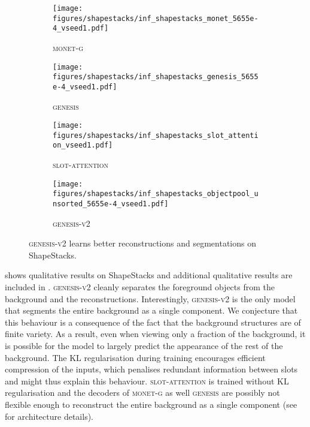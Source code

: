 \documentclass{article}
\begin{document}
\begin{figure}
	\centering
	\begin{subfigure}{0.259\linewidth}
		\texttt{[image: figures/shapestacks/inf\_shapestacks\_monet\_5655e-4\_vseed1.pdf]}
		\caption{\textsc{monet-g}}
	\end{subfigure}
	\begin{subfigure}{0.24\linewidth}
		\texttt{[image: figures/shapestacks/inf\_shapestacks\_genesis\_5655e-4\_vseed1.pdf]}
		\caption{\textsc{genesis}}
	\end{subfigure}
	\begin{subfigure}{0.24\linewidth}
		\texttt{[image: figures/shapestacks/inf\_shapestacks\_slot\_attention\_vseed1.pdf]}
		\caption{\textsc{slot-attention}}
	\end{subfigure}
	\begin{subfigure}{0.24\linewidth}
		\texttt{[image: figures/shapestacks/inf\_shapestacks\_objectpool\_unsorted\_5655e-4\_vseed1.pdf]}
		\caption{\textsc{genesis-v2}}
	\end{subfigure}
	\caption{\textsc{genesis-v2} learns better reconstructions and segmentations on ShapeStacks.}
	\label{fig:gpp:shapestacks:seg}
\end{figure}

 shows qualitative results on ShapeStacks and additional qualitative results are included in .
\textsc{genesis-v2} cleanly separates the foreground objects from the background and the reconstructions.
Interestingly, \textsc{genesis-v2} is the only model that segments the entire background as a single component.
We conjecture that this behaviour is a consequence of the fact that the background structures are of finite variety.
As a result, even when viewing only a fraction of the background, it is possible for the model to largely predict the appearance of the rest of the background. 
The KL regularisation during training encourages efficient compression of the inputs, which penalises redundant information between slots and might thus explain this behaviour.
\textsc{slot-attention} is trained without KL regularisation and the decoders of \textsc{monet-g} as well \textsc{genesis} are possibly not flexible enough to reconstruct the entire background as a single component (see  for architecture details).
\end{document}
